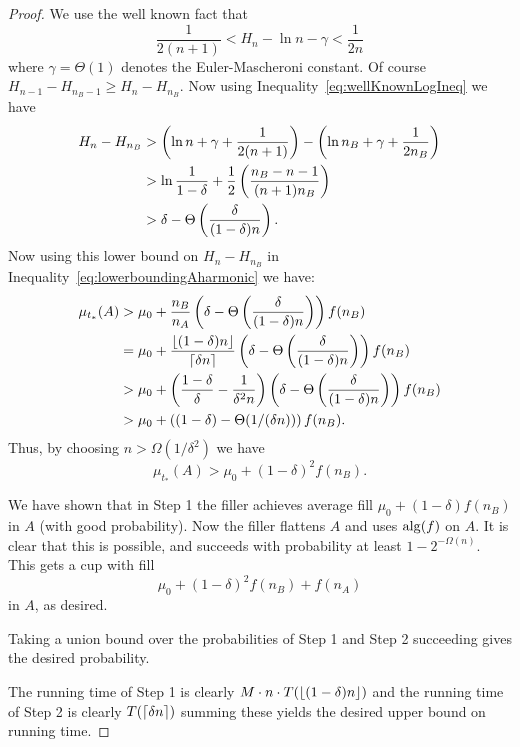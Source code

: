 \begin{proof}
  We use the well known fact that 
  \begin{equation}
    \label{eq:wellKnownLogIneq}
    \frac{1}{2(n+1)} < H_n - \ln n - \gamma < \frac{1}{2n}
  \end{equation}
  where $\gamma = \Theta(1)$ denotes the Euler-Mascheroni constant.
  Of course $H_{n-1}-H_{n_B-1} \ge H_n - H_{n_B}.$ Now using
  Inequality~\eqref{eq:wellKnownLogIneq} we have
  \begin{align*}
    H_n - H_{n_B} &> \left( \ln n + \gamma + \frac{1}{2(n+1)} \right) - \left( \ln n_B + \gamma + \frac{1}{2n_B} \right)\\
                  &> \ln \frac{1}{1-\delta} + \frac{1}{2}\left( \frac{n_B-n-1}{(n+1)n_B} \right)\\
                  &> \delta - \Theta\left( \frac{\delta}{(1-\delta)n} \right).
  \end{align*}
  Now using this lower bound on $H_n - H_{n_B}$ in
  Inequality~\eqref{eq:lowerboundingAharmonic} we have:
  \begin{align*}
    \mu_{t_*}(A) &> \mu_0 + \frac{n_B}{n_A}\left( \delta - \Theta\left( \frac{\delta}{(1-\delta)n} \right) \right)f(n_B)\\
                 &= \mu_0 + \frac{\left\lfloor (1-\delta)n \right\rfloor}{\left\lceil \delta n \right\rceil}\left( \delta - \Theta\left( \frac{\delta}{(1-\delta)n} \right) \right)f(n_B)\\
                 &> \mu_0 + \left( \frac{1-\delta}{\delta} - \frac{1}{\delta^2 n} \right)\left( \delta - \Theta\left( \frac{\delta}{(1-\delta)n} \right) \right)f(n_B)\\
                 &> \mu_0 + \left( (1-\delta) - \Theta(1/(\delta n)) \right)f(n_B).
  \end{align*}
  Thus, by choosing $n > \Omega(1/\delta^2)$ we have 
  $$\mu_{t_*}(A) > \mu_0 + (1-\delta)^2 f(n_B).$$

We have shown that in Step 1 the filler achieves average fill
$\mu_0 + (1-\delta)f(n_B)$ in $A$ (with good probability).
Now the filler flattens $A$ and uses $\operatorname{\text{\textup{alg}}}(f)$ on $A$.
It is clear that this is possible, and succeeds with probability
at least $1-2^{-\Omega(n)}$.
This gets a cup with fill 
$$\mu_0 + (1-\delta)^2 f(n_B) + f(n_A)$$
in $A$, as desired.

Taking a union bound over the probabilities of Step 1 and Step 2
succeeding gives the desired probability. 

The running time of Step 1 is clearly $M\cdot n\cdot
T(\left\lfloor (1-\delta)n \right\rfloor)$ and the running time of Step 2 is clearly
$T(\left\lceil \delta n \right\rceil)$ summing these yields the desired upper
bound on running time.

\end{proof}

